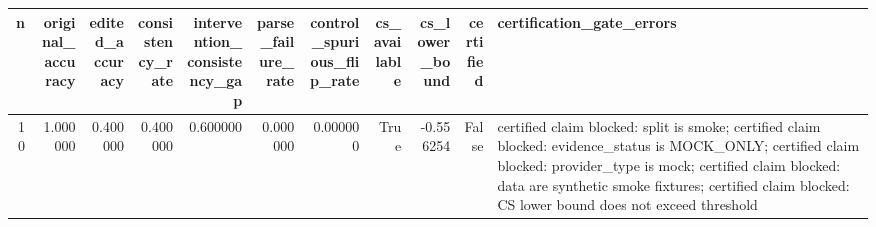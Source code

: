 \begin{tabular}{rrrrrrrrrrl}
\toprule
n & original_accuracy & edited_accuracy & consistency_rate & intervention_consistency_gap & parse_failure_rate & control_spurious_flip_rate & cs_available & cs_lower_bound & certified & certification_gate_errors \\
\midrule
10 & 1.000000 & 0.400000 & 0.400000 & 0.600000 & 0.000000 & 0.000000 & True & -0.556254 & False & certified claim blocked: split is smoke; certified claim blocked: evidence_status is MOCK_ONLY; certified claim blocked: provider_type is mock; certified claim blocked: data are synthetic smoke fixtures; certified claim blocked: CS lower bound does not exceed threshold \\
\bottomrule
\end{tabular}
